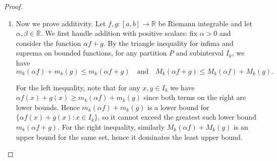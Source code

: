 \begin{proof}
\begin{enumerate}
    Taking the supremum over all partitions on the left side of the lower sum identity gives $$\sup_P L(\alpha f,P) = \sup_P \bigl(\alpha L(f,P)\bigr) = \alpha \cdot \sup_P L(f,P),$$ since $\alpha > 0$ and multiplication by a positive scalar commutes with taking suprema. Similarly, taking the infimum gives $$\inf_P U(\alpha f,P) = \alpha \cdot \inf_P U(f,P).$$ Since $f$ is Riemann integrable, its lower and upper integrals are equal; hence the corresponding quantities for $\alpha f$ are also equal, so $\alpha f$ is Riemann integrable. Moreover,
    $$\int_a^b \alpha f(x)\,dx = \sup_P L(\alpha f,P) = \alpha \cdot \sup_P L(f,P) = \alpha \int_a^b f(x)\,dx.$$

    Finally, suppose $\alpha < 0$. Write $\alpha = -|\alpha|$. For any partition $P$ and subinterval $I_k$, we use the relation between infima under negation: $$\inf\{-h(x) : x \in I_k\} = -\sup\{h(x) : x \in I_k\},$$ so that $m_k(\alpha f) = m_k(-|\alpha|f) = -M_k(|\alpha|f) = -|\alpha| \cdot M_k(f)$. Similarly, $M_k(\alpha f) = -|\alpha| \cdot m_k(f)$. Therefore
    $$L(\alpha f,P) = \sum_{k=1}^n m_k(\alpha f)(x_k-x_{k-1}) = \sum_{k=1}^n \bigl(-|\alpha| M_k(f)\bigr)(x_k-x_{k-1}) = -|\alpha| U(f,P) = \alpha U(f,P),$$ and similarly $U(\alpha f,P) = \alpha L(f,P)$. Taking suprema of lower sums:
    $$\sup_P L(\alpha f,P) = \sup_P \bigl(\alpha U(f,P)\bigr).$$ Since $\alpha < 0$, we have $\alpha U(f,P) = -|\alpha| U(f,P)$, and $\sup_P(-|\alpha| U(f,P)) = -|\alpha| \cdot \inf_P U(f,P) = \alpha \cdot \inf_P U(f,P)$. Because $f$ is integrable, $\inf_P U(f,P) = \int_a^b f(x)\,dx$, so
    $$\int_a^b \alpha f(x)\,dx = \sup_P L(\alpha f,P) = \alpha \cdot \inf_P U(f,P) = \alpha \int_a^b f(x)\,dx.$$

    \item Now we prove additivity. Let $f,g : [a,b] \to \mathbb{R}$ be Riemann integrable and let $\alpha,\beta \in \mathbb{R}$. We first handle addition with positive scalars: fix $\alpha > 0$ and consider the function $\alpha f + g$. By the triangle inequality for infima and suprema on bounded functions, for any partition $P$ and subinterval $I_k$, we have
    $$m_k(\alpha f) + m_k(g) \leq m_k(\alpha f + g) \quad\text{and}\quad M_k(\alpha f + g) \leq M_k(\alpha f) + M_k(g).$$

    For the left inequality, note that for any $x,y \in I_k$ we have $\alpha f(x) + g(x) \geq m_k(\alpha f) + m_k(g)$ since both terms on the right are lower bounds. Hence $m_k(\alpha f) + m_k(g)$ is a lower bound for $\{\alpha f(x) + g(x) : x \in I_k\}$, so it cannot exceed the greatest such lower bound $m_k(\alpha f + g)$. For the right inequality, similarly $M_k(\alpha f) + M_k(g)$ is an upper bound for the same set, hence it dominates the least upper bound.


\end{enumerate}
\end{proof}
